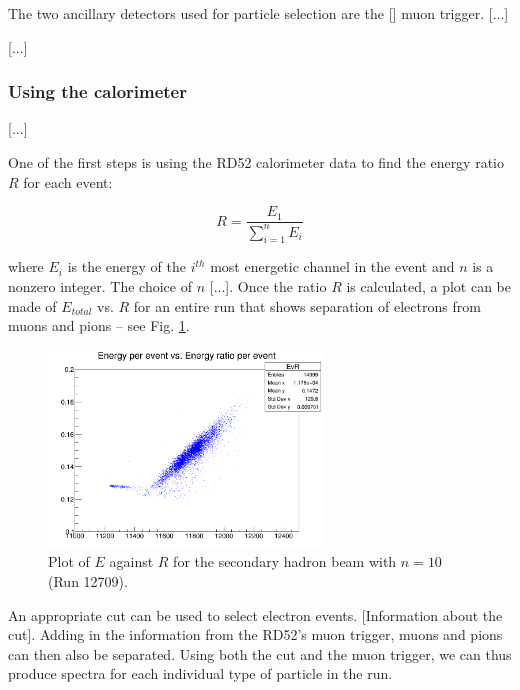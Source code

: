 The two ancillary detectors used for particle selection are the [] muon trigger. [...]

[...]

\subsubsection{Using the calorimeter}
[...]

One of the first steps is using the RD52 calorimeter data to find the energy ratio $R$ for each event:

\begin{displaymath}
	R = \frac{E_1}{\sum_{i=1}^{n} E_i}
\end{displaymath}

where $E_i$ is the energy of the $i^{th}$ most energetic channel in the event and $n$ is a nonzero integer. The choice of $n$ [...]. Once the ratio $R$ is calculated, a plot can be made of $E_{total}$ vs. $R$ for an entire run that shows separation of electrons from muons and pions -- see Fig. \ref{figure:testbeam/results/EvR}.


\begin{figure}[h]
	\centering
	\includegraphics[width=0.65\textwidth]{../Pictures/12709-EvR.png}
	\caption{Plot of $E$ against $R$ for the secondary hadron beam with $n = 10$ (Run 12709).}
	\label{figure:testbeam/results/EvR}
\end{figure}

An appropriate cut can be used to select electron events. [Information about the cut]. Adding in the information from the RD52's muon trigger, muons and pions can then also be separated. Using both the cut and the muon trigger, we can thus produce spectra for each individual type of particle in the run.

